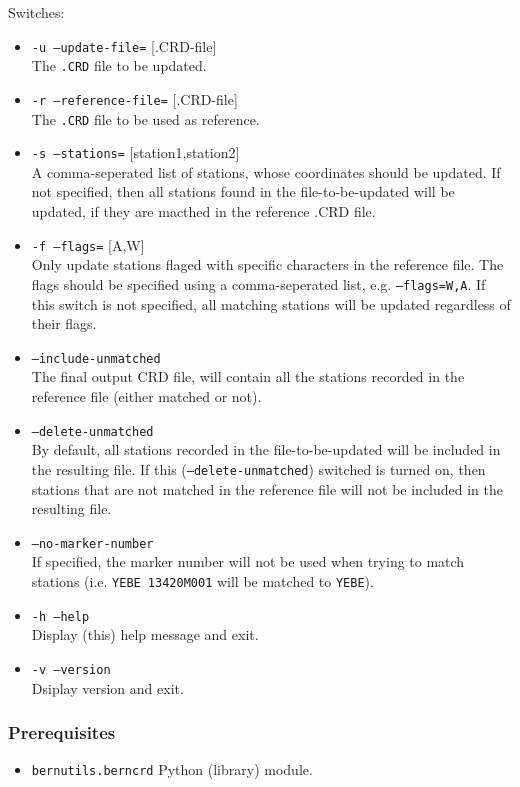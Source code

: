 Switches:
\begin{itemize}
\item \texttt{-u --update-file=} [.CRD-file]\\
The \texttt{.CRD} file to be updated.
\item \texttt{-r --reference-file=} [.CRD-file]\\
The \texttt{.CRD} file to be used as reference.
\item \texttt{-s --stations=} [station1,station2]\\
A comma-seperated list of stations, whose coordinates should be updated. 
If not specified, then all stations found in the file-to-be-updated will be
updated, if they are macthed in the reference .CRD file.
\item \texttt{-f --flags=} [A,W]\\
Only update stations flaged with specific characters in the 
reference file. The flags should be specified using a comma-seperated list, 
e.g. \texttt{--flags=W,A}. If this switch is not specified, 
all matching stations will be updated regardless of their flags.
\item \texttt{--include-unmatched}\\
The final output CRD file, will contain all the stations recorded
in the reference file (either matched or not).
\item \texttt{--delete-unmatched}\\
By default, all stations recorded in the file-to-be-updated will be included
in the resulting file. If this (\texttt{--delete-unmatched}) switched is turned on,
then stations that are not matched in the reference file will not be included in the
resulting file.
\item \texttt{--no-marker-number}\\
If specified, the marker number will not be used when trying to match
stations (i.e. \texttt{YEBE 13420M001} will be matched to \texttt{YEBE}).
\item \texttt{-h --help}\\
Display (this) help message and exit.
\item \texttt{-v --version}\\
Dsiplay version and exit.
\end{itemize}

\subsubsection{Prerequisites}
\begin{itemize}
\item \texttt{bernutils.berncrd} Python (library) module.
\end{itemize}

